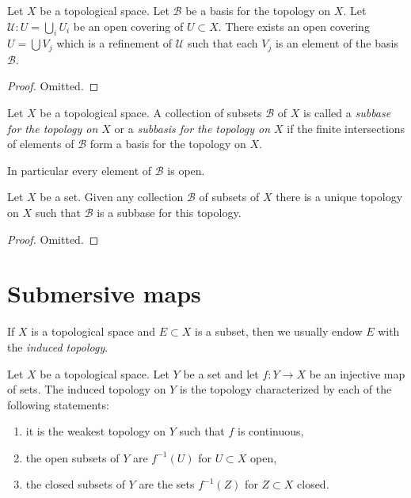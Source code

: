 \begin{lemma}
\label{lemma-refine-covering-basis}
Let $X$ be a topological space.
Let $\mathcal{B}$ be a basis for the topology on $X$.
Let $\mathcal{U} : U = \bigcup_i U_i$ be an open covering of
$U \subset X$. There exists an open covering $U = \bigcup V_j$
which is a refinement of $\mathcal{U}$ such that each
$V_j$ is an element of the basis $\mathcal{B}$.
\end{lemma}

\begin{proof}
Omitted.
\end{proof}

\begin{definition}
\label{definition-subbase}
Let $X$ be a topological space. A collection of subsets $\mathcal{B}$ of $X$
is called a {\it subbase for the topology on $X$} or a {\it subbasis for the
topology on $X$} if the finite intersections of
elements of $\mathcal{B}$ form a basis for the topology on $X$.
\end{definition}

\noindent
In particular every element of $\mathcal{B}$ is open.

\begin{lemma}
\label{lemma-subbase}
Let $X$ be a set. Given any collection $\mathcal{B}$ of subsets of $X$
there is a unique topology on $X$ such that $\mathcal{B}$ is a subbase
for this topology.
\end{lemma}

\begin{proof}
Omitted.
\end{proof}





\section{Submersive maps}
\label{section-submersive}

\noindent
If $X$ is a topological space and $E \subset X$ is a subset, then
we usually endow $E$ with the {\it induced topology}.

\begin{lemma}
\label{lemma-induced}
Let $X$ be a topological space. Let $Y$ be a set and let
$f : Y \to X$ be an injective map of sets. The induced
topology on $Y$ is the topology characterized by
each of the following statements:
\begin{enumerate}
\item it is the weakest topology on $Y$ such that $f$ is continuous,
\item the open subsets of $Y$ are $f^{-1}(U)$ for $U \subset X$ open,
\item the closed subsets of $Y$ are the sets $f^{-1}(Z)$ for $Z \subset X$
closed.
\end{enumerate}
\end{lemma}

